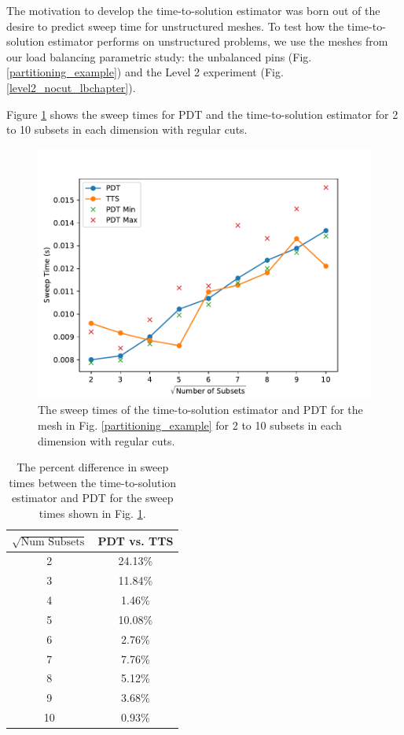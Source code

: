 The motivation to develop the time-to-solution estimator was born out of the desire to predict sweep time for unstructured meshes.
To test how the time-to-solution estimator performs on unstructured problems, we use the meshes from our load balancing parametric study: the unbalanced pins (Fig. \ref{partitioning_example}) and the Level 2 experiment (Fig. \ref{level2_nocut_lbchapter}).

Figure \ref{comp_reg_spiderweb} shows the sweep times for PDT and the time-to-solution estimator for 2 to 10 subsets in each dimension with regular cuts. 
\begin{figure}[ht]
\centering
\includegraphics[scale=0.75]{../../figures/spiderweb_reg_pdtvtts.pdf}
\caption{The sweep times of the time-to-solution estimator and PDT for the mesh in Fig. \ref{partitioning_example} for 2 to 10 subsets in each dimension with regular cuts.}
\label{comp_reg_spiderweb}
\end{figure}
\begin{table}[ht]
\centering
\caption{The percent difference in sweep times between the time-to-solution estimator and PDT for the sweep times shown in Fig. \ref{comp_reg_spiderweb}.}
\label{diff_reg_spiderweb}
\begin{tabular}{c|c}
\textbf{$\sqrt{\text{Num Subsets}}$} & \bf PDT vs. TTS \\ \hline
2&24.13\%\\ \hline
3&11.84\%\\ \hline
4&1.46\%\\ \hline
5&10.08\%\\ \hline
6&2.76\%\\ \hline
7&7.76\%\\ \hline
8&5.12\%\\ \hline
9&3.68\%\\ \hline
10&0.93\%
\end{tabular}
\end{table}

